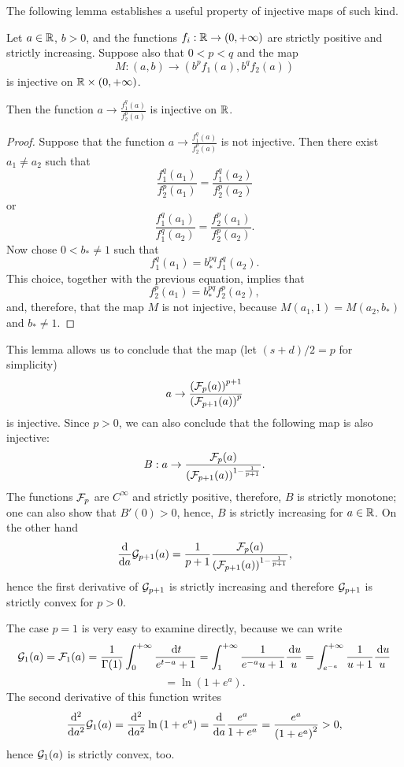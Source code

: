 \documentclass{article}
\begin{document}
The following lemma establishes a useful property of injective maps of such kind.
\begin{lemma}
	Let $a\in{\mathbb R}$, $b>0$, and the functions $f_i:{\mathbb R}\to(0,+\infty)$ are strictly positive and strictly increasing. Suppose also that $0<p<q$ and the map
	\[
		M:(a,b)\to (b^pf_1(a),b^q f_2(a))
	\]
	is injective on ${\mathbb R}\times(0,+\infty)$.

	Then the function $a\to \frac{f_1^q(a)}{f_2^p(a)}$ is injective on ${\mathbb R}$.
	\label{le:inject}
\end{lemma}
\begin{proof}
	Suppose that the function $a\to \frac{f_1^q(a)}{f_2^p(a)}$ is not injective. Then there exist $a_1\ne a_2$ such that
	\[
		\frac{f_1^q(a_1)}{f_2^p(a_1)}=\frac{f_1^q(a_2)}{f_2^p(a_2)}
	\]
	or
	\[
		\frac{f_1^q(a_1)}{f_1^q(a_2)}=\frac{f_2^p(a_1)}{f_2^p(a_2)}.
	\]
	Now chose $0<b_*\ne1$ such that 
	\[
		f_1^q(a_1) = b_*^{pq}f_1^{q}(a_2).
	\]
	This choice, together with the previous equation, implies that
	\[
		f_2^p(a_1) = b_*^{pq}f_2^p(a_2),
	\]
	and, therefore, that the map $M$ is not injective, because $M(a_1,1)=M(a_2,b_*)$ and $b_*\ne 1$.
\end{proof}

This lemma allows us to conclude that the map (let $(s+d)/2=p$ for simplicity) 
\[
	a\to\frac{\left( \mathcal F_{p}(a) \right)^{p+1}}{\left( \mathcal F_{p+1}(a) \right)^{p}}
\]
is injective.
Since $p> 0$, we can also conclude that the following map is also injective:
\begin{equation}
	B:a\to\frac{\mathcal F_{p}(a)}{\left( \mathcal F_{p+1}(a) \right)^{1-\frac{1}{p+1}}}.
	\label{eq:poly:frac}
\end{equation}
The functions $\mathcal F_p$ are $C^{\infty}$ and strictly positive, therefore, $B$ is strictly monotone; one can also show that $B'(0)>0$, hence, $B$ is strictly increasing for $a\in{\mathbb R}$.
On the other hand
\[
	\frac{\mathrm d}{\mathrm da}\mathcal G_{p+1}(a)=\frac{1}{p+1}\frac{\mathcal F_p(a)}{\left( \mathcal F_{p+1}(a) \right)^{1-\frac{1}{p+1}}},
\]
hence the first derivative of $\mathcal G_{p+1}$ is strictly increasing and therefore $\mathcal G_{p+1}$ is strictly convex for $p>0$.

The case $p=1$ is very easy to examine directly, because we can write
\[
	\mathcal G_1(a)=\mathcal F_1(a) =\frac{1}{\Gamma(1)} \int_{0}^{+\infty}\frac{{\,\mathrm dt}}{e^{t-a}+1}=\int_{1}^{+\infty}\frac{1}{e^{-a}u+1}\frac{{\,\mathrm du}}{u}=\int_{e^{-a}}^{+\infty}\frac{1}{u+1}\frac{{\,\mathrm du}}{u}
\]
\[
	=\ln\left( 1+e^{a} \right).
\]
The second derivative of this function writes
\[
	\frac{\mathrm d^2}{\mathrm da^2}\mathcal G_{1}(a)=\frac{\mathrm d^2}{\mathrm da^2}\ln\left( 1+e^{a} \right)=\frac{\mathrm d}{\mathrm da}\frac{e^a}{1+e^a}=\frac{e^a}{\left( 1+e^a \right)^2}>0,
\]
hence $\mathcal G_1(a)$ is strictly convex, too.
\end{document}
